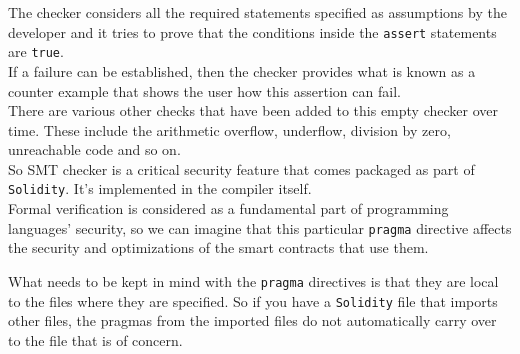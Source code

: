 \begin{enumerate}
  The checker considers all the required statements specified as
  assumptions by the developer and it tries to prove that the conditions
  inside the \texttt{assert} statements are \texttt{true}.\\

  If a failure can be established, then the checker provides what is
  known as a counter example that shows the user how this assertion can
  fail.\\

  There are various other checks that have been added to this empty
  checker over time. These include the arithmetic overflow, underflow,
  division by zero, unreachable code and so on.\\

  So SMT checker is a critical security feature that comes packaged as
  part of \texttt{Solidity}. It's implemented in the compiler itself.\\

  Formal verification is considered as a fundamental part of programming
  languages' security, so we can imagine that this particular
  \texttt{pragma} directive affects the security and optimizations of
  the smart contracts that use them.
\end{enumerate}

What needs to be kept in mind with the \texttt{pragma} directives is
that they are local to the files where they are specified. So if you
have a \texttt{Solidity} file that imports other files, the pragmas from
the imported files do not automatically carry over to the file that is
of concern.
